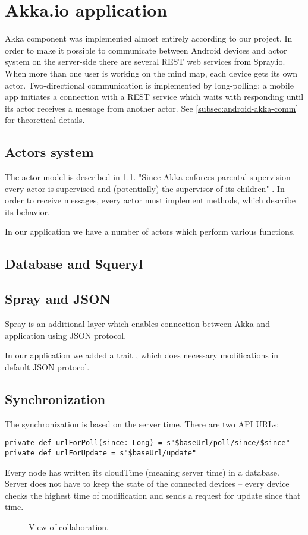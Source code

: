 \section{Akka.io application}
\label{sec:akka-app}
Akka component was implemented almost entirely according to our project. In order to make it possible to communicate between Android devices and actor system on the server-side there are several REST web services from Spray.io. When more than one user is working on the mind map, each device gets its own actor.  Two-directional communication is implemented by long-polling: a mobile app initiates a connection with a REST service which waits with responding until its actor receives a message from another actor. See \cref{subsec:android-akka-comm} for theoretical details.  

\subsection{Actors system }
\label{subsection:akka-actors}
The actor model is described in \cref{subsection:akka-actors}. "Since Akka enforces parental supervision every actor is supervised and (potentially) the supervisor of its children" \cite{AkkaDoc:2013:Actors}. In order to receive messages, every actor must implement  methods, which describe its behavior. 

In our application we have a number of actors which perform various functions.


\subsection{Database and Squeryl}
\label{subsection:akka-database}

\subsection{Spray and JSON}
\label{subsection:akka-spray}
Spray is an additional layer which enables connection between Akka and application using JSON protocol. 

In our application we added a trait , which does necessary modifications in default JSON protocol. 

\subsection{Synchronization}
\label{subsection:akka-synchro}
The synchronization is based on the server time. 
There are two API URLs: 
\begin{verbatim}
private def urlForPoll(since: Long) = s"$baseUrl/poll/since/$since"
private def urlForUpdate = s"$baseUrl/update"
\end{verbatim}
Every node has written its cloudTime (meaning server time) in a database. Server does not have to keep the state of the connected devices -- every device checks the highest time of modification and sends a request for update since that time.


\begin{figure}[h]
	\centering
	\caption{View of collaboration.}
	\label{fig:screen-collaboration}
\end{figure}
